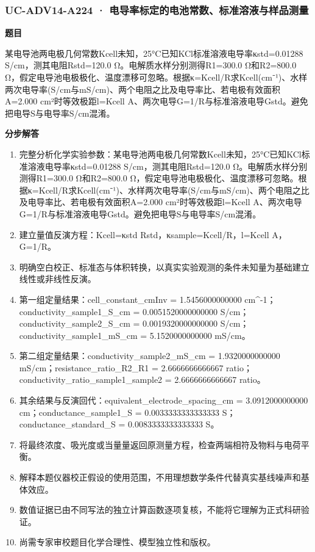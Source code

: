\documentclass[UTF8,11pt,a4paper]{ctexart}
\begin{document}
\subsubsection*{UC-ADV14-A224 · 电导率标定的电池常数、标准溶液与样品测量}
\noindent\textbf{题目}\par
某电导池两电极几何常数Kcell未知，25°C已知KCl标准溶液电导率κstd=0.01288 S/cm，测其电阻Rstd=120.0 Ω。电解质水样分别测得R1=300.0 Ω和R2=800.0 Ω，假定电导池电极极化、温度漂移可忽略。根据κ=Kcell/R求Kcell(cm⁻¹)、水样两次电导率(S/cm与mS/cm)、两个电阻之比及电导率比、若电极有效面积A=2.000 cm²时等效极距l=Kcell A、两次电导G=1/R与标准溶液电导Gstd。避免把电导S与电导率S/cm混淆。\par
\medskip\noindent\textbf{分步解答}
\begin{enumerate}
\item 完整分析化学实验参数：某电导池两电极几何常数Kcell未知，25°C已知KCl标准溶液电导率κstd=0.01288 S/cm，测其电阻Rstd=120.0 Ω。电解质水样分别测得R1=300.0 Ω和R2=800.0 Ω，假定电导池电极极化、温度漂移可忽略。根据κ=Kcell/R求Kcell(cm⁻¹)、水样两次电导率(S/cm与mS/cm)、两个电阻之比及电导率比、若电极有效面积A=2.000 cm²时等效极距l=Kcell A、两次电导G=1/R与标准溶液电导Gstd。避免把电导S与电导率S/cm混淆。
\item 建立量值反演方程：Kcell=κstd Rstd，κsample=Kcell/R，l=Kcell A，G=1/R。
\item 明确空白校正、标准态与体积转换，以真实实验观测的条件未知量为基础建立线性或非线性反演。
\item 第一组定量结果：cell\_constant\_cmInv = 1.5456000000000 cm\textasciicircum{}-1；conductivity\_sample1\_S\_cm = 0.0051520000000000 S/cm；conductivity\_sample2\_S\_cm = 0.0019320000000000 S/cm；conductivity\_sample1\_mS\_cm = 5.1520000000000 mS/cm。
\item 第二组定量结果：conductivity\_sample2\_mS\_cm = 1.9320000000000 mS/cm；resistance\_ratio\_R2\_R1 = 2.6666666666667 ratio；conductivity\_ratio\_sample1\_sample2 = 2.6666666666667 ratio。
\item 其余结果与反演回代：equivalent\_electrode\_spacing\_cm = 3.0912000000000 cm；conductance\_sample1\_S = 0.0033333333333333 S；conductance\_standard\_S = 0.0083333333333333 S。
\item 将最终浓度、吸光度或当量量返回原测量方程，检查两端相符及物料与电荷平衡。
\item 解释本题仪器校正假设的使用范围，不用理想数学条件代替真实基线噪声和基体效应。
\item 数值证据已由不同写法的独立计算函数逐项复核，不能将它理解为正式科研验证。
\item 尚需专家审校题目化学合理性、模型独立性和版权。
\end{enumerate}
\end{document}
